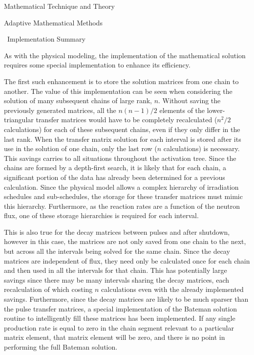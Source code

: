 \begin{chapter}{Mathematical Technique and Theory\label{chap:math}}
\begin{section}{Adaptive Mathematical Methods\label{sec:math.adaptive}}
  \end{section}
  
  \begin{section}{\ALARA\  Implementation Summary}\label{sec:math.implement}
  
    As with the physical modeling, the implementation of the
    mathematical solution requires some special implementation to
    enhance its efficiency.
  
    \enlargethispage*{\baselineskip}
    The first such enhancement is to store the solution matrices from
    one chain to another.  The value of this implementation can be
    seen when considering the solution of many subsequent chains of
    large rank, $n$.  Without saving the previously generated
    matrices, all the $n(n-1)/2$ elements of the lower-triangular
    transfer matrices would have to be completely recalculated
    ($n^2/2$ calculations) for each of these subsequent chains, even
    if they only differ in the last rank.  When the transfer matrix
    solution for each interval is stored after its use in the solution
    of one chain, only the last row ($n$ calculations) is necessary.
    This savings carries to all situations throughout the activation
    tree.  Since the chains are formed by a depth-first search, it is
    likely that for each chain, a significant portion of the data has
    already been determined for a previous calculation.  Since the
    physical model allows a complex hierarchy of irradiation schedules
    and sub-schedules, the storage for these transfer matrices must
    mimic this hierarchy.  Furthermore, as the reaction rates are a
    function of the neutron flux, one of these storage hierarchies is
    required for each interval.
    
    \enlargethispage*{\baselineskip}
    This is also true for the decay matrices between pulses and after
    shutdown, however in this case, the matrices are not only saved
    from one chain to the next, but across all the intervals being
    solved for the same chain.  Since the decay matrices are
    independent of flux, they need only be calculated once for each
    chain and then used in all the intervals for that chain.  This has
    potentially large savings since there may be many intervals
    sharing the decay matrices, each recalculation of which costing
    $n$ calculations even with the already implemented savings.
    Furthermore, since the decay matrices are likely to be much
    sparser than the pulse transfer matrices, a special implementation
    of the Bateman solution routine to intelligently fill these
    matrices has been implemented.  If any single production rate is
    equal to zero in the chain segment relevant to a particular matrix
    element, that matrix element will be zero, and there is no point
    in performing the full Bateman solution.
  

\end{section}
\end{chapter}
